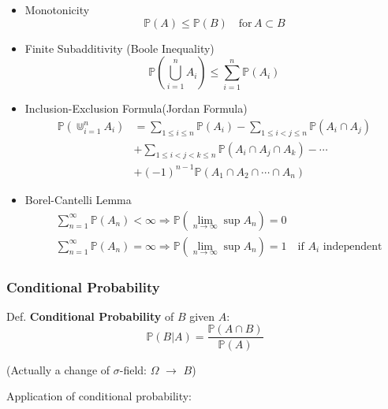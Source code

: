     \begin{itemize}
        \item Monotonicity
        \begin{equation}    
            \mathbb{P}(A)\leq \mathbb{P}(B)\quad \text{for}\, A\subset B
        \end{equation}
        \item Finite Subadditivity (Boole Inequality)
        \begin{equation}    
            \mathbb{P}(\bigcup_{i=1}^nA_i)\leq\sum_{i=1}^n \mathbb{P}(A_i)    
        \end{equation}
        \item Inclusion-Exclusion Formula(Jordan Formula)
        \begin{align}
            \mathbb{P}(\Cup_{i=1}^nA_i)&=\sum_{1\leq i\leq n}\mathbb{P}(A_i)-\sum_{1\leq i<j\leq n}\mathbb{P}(A_i\cap A_j)\\
            &+\sum_{1\leq i<j<k\leq n}\mathbb{P}(A_i\cap A_j\cap A_k)-\cdots\\
            &+(-1)^{n-1}\mathbb{P}(A_1 \cap A_2\cap\cdots \cap A_n)
        \end{align}
        \item Borel-Cantelli Lemma
        \begin{align}
            &\sum_{n=1}^\infty \mathbb{P}(A_n)<\infty\Rightarrow \mathbb{P}(\lim_{n\to\infty}\sup A_n)=0\\
            &\sum_{n=1}^\infty \mathbb{P}(A_n)=\infty\Rightarrow \mathbb{P}(\lim_{n\to\infty}\sup A_n)=1\quad \text{if }A_i\text{ independent}
        \end{align}
            
    \end{itemize}


\subsubsection{Conditional Probability}
        Def. \textbf{Conditional Probability} of $B$ given $A$:
        \begin{equation}    
            \mathbb{P}(B|A)=\frac{\mathbb{P}(A\cap B)}{\mathbb{P}(A)}    
        \end{equation}

        (Actually a change of $\sigma$-field: $\Omega$ $ \to $ $B$)

\begin{point}
    Application of conditional probability:
\end{point}

